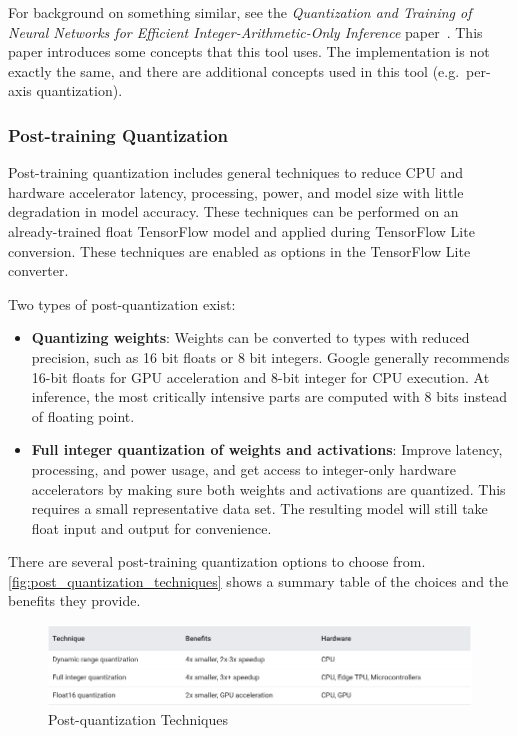 For background on something similar, see the \textit{Quantization and Training
of Neural Networks for Efficient Integer-Arithmetic-Only Inference}
paper~\cite{Jacob_2018}.
This paper introduces some concepts that this tool uses.
The implementation is not exactly the same, and there are additional concepts
used in this tool (e.g.\ per-axis quantization).~\cite{tfmot:quantization_training}

\subsubsection{Post-training Quantization}
Post-training quantization includes general techniques to reduce CPU and
hardware accelerator latency, processing, power, and model size with little
degradation in model accuracy. These techniques can be performed on an
already-trained float TensorFlow model and applied during TensorFlow Lite
conversion. These techniques are enabled as options in the TensorFlow Lite
converter.

Two types of post-quantization exist:
\begin{itemize}
    \item \textbf{Quantizing weights}: Weights can be converted to types with
        reduced precision, such as 16 bit floats or 8 bit integers. Google
        generally recommends 16-bit floats for GPU acceleration and 8-bit
        integer for CPU execution. At inference, the most critically intensive
        parts are computed with 8 bits instead of floating point.
    \item \textbf{Full integer quantization of weights and activations}:
        Improve latency, processing, and power usage, and get access to
        integer-only hardware accelerators by making sure both weights and
        activations are quantized.  This requires a small representative data
        set. The resulting model will still take float input and output for
        convenience.
\end{itemize}

There are several post-training quantization options to choose from.
\autoref{fig:post_quantization_techniques} shows a summary table of the choices
and the benefits they provide.~\cite{tfmot:quantization_post_training}

\begin{figure}[ht]
    \includegraphics[width=\textwidth]{images/introduction/post_quantization_techniques.png}
    \centering
    \caption{Post-quantization Techniques}\label{fig:post_quantization_techniques}
\end{figure}

